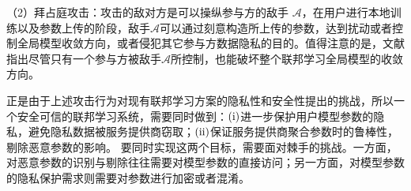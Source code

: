 （2）拜占庭攻击：攻击的敌对方是可以操纵参与方的敌手 $\mathcal{A}$，在用户进行本地训练以及参数上传的阶段，敌手$\mathcal{A}$可以通过刻意构造所上传的参数，达到扰动或者控制全局模型收敛方向，或者侵犯其它参与方数据隐私的目的\cite{kairouz2019advances}。值得注意的是，文献\cite{blanchard2017machine}指出尽管只有一个参与方被敌手$\mathcal{A}$所控制，也能破坏整个联邦学习全局模型的收敛方向。

正是由于上述攻击行为对现有联邦学习方案的隐私性和安全性提出的挑战，所以一个安全可信的联邦学习系统，需要同时做到：$(\rm \romannumeral1)$进一步保护用户模型参数的隐私，避免隐私数据被服务提供商窃取；$(\rm \romannumeral2)$保证服务提供商聚合参数时的鲁棒性，剔除恶意参数的影响。
要同时实现这两个目标，需要面对棘手的挑战。一方面，对恶意参数的识别与剔除往往需要对模型参数的直接访问；另一方面，对模型参数的隐私保护需求则需要对参数进行加密或者混淆。




